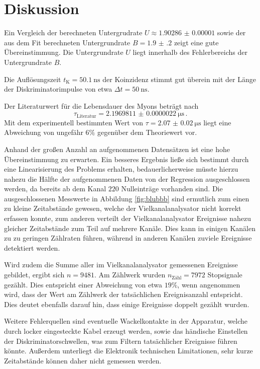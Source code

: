 \section{Diskussion}
\label{sec:Diskussion}
Ein Vergleich der berechneten Untergrudrate $U \approx \num{1.90286(1)} $ sowie der aus dem Fit berechneten Untergrundrate $B=\num{1.9(2)}$ zeigt eine gute Übereinstimmung. Die Untergrundrate $U$ liegt innerhalb des Fehlerbereichs der Untergrundrate $B$.

Die Auflösungszeit $t_{\text{K}}=\SI{50.1}{\nano\second}$ der Koinzidenz stimmt gut überein mit der Länge der Diskriminatorimpulse von etwa $\Delta t=\SI{50}{\nano\second}$.

Der Literaturwert für die Lebensdauer des Myons beträgt nach \cite{myon}
\begin{equation*}
	\tau_\text{Literatur} = \SI{2.1969811(22)}{\micro\second}\, \mathrm{.}
\end{equation*}
Mit dem experimentell bestimmten Wert von $\tau=\SI{2.07(2)}{\micro\second}$ liegt eine Abweichung von ungefähr $6 \%$ gegenüber dem Theoriewert vor.

Anhand der großen Anzahl an aufgenommenen Datensätzen ist eine hohe Übereinstimmung zu erwarten. Ein besseres Ergebnis ließe sich bestimmt durch eine Linearisierung des Problems erhalten, bedauerlicherweise müsste hierzu nahezu die Hälfte der aufgenommenen Daten von der Regression ausgeschlossen werden, da bereits ab dem Kanal $220$ Nulleinträge vorhanden sind.
Die ausgeschlossenen Messwerte in Abbildung \ref{fig:blubbb} sind ermutlich zum einen zu kleine Zeitabstände gewesen, welche der Vielkanalanalysator nicht korrekt erfassen konnte, zum anderen verteilt der Vielkanalanalysator Ereignisse nahezu gleicher Zeitabstände zum Teil auf mehrere Kanäle. Dies kann in einigen Kanälen zu zu geringen Zählraten führen, während in anderen Kanälen zuviele Ereignisse detektiert werden.

Wird zudem die Summe aller im Vielkanalanalysator gemessenen Ereignisse gebildet, ergibt sich $n=\num{9481}$. Am Zählwerk wurden $n_{\text{Zähl}}=\num{7972}$ Stopsignale gezählt. Dies entspricht einer Abweichung von etwa $19\%$, wenn angenommen wird, dass der Wert am Zählwerk der tatsächlichen Ereignisanzahl entspricht. Dies deutet ebenfalls darauf hin, dass einige Ereignisse doppelt gezählt wurden.

Weitere Fehlerquellen sind eventuelle Wackelkontakte in der Apparatur, welche durch locker eingesteckte Kabel erzeugt werden, sowie das händische Einstellen der Diskriminatorschwellen, was zum Filtern tatsächlicher Ereignisse führen könnte. Außerdem unterliegt die Elektronik technischen Limitationen, sehr kurze Zeitabstände können daher nicht gemessen werden.
